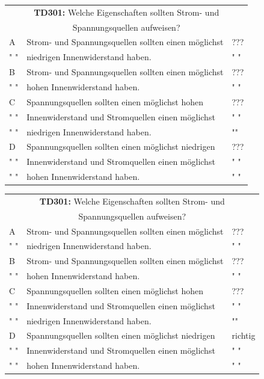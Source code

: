 \begin{frame}
	\begin{small}	
	\begin{tabular}{|l|l|l|}
	\hline
		\multicolumn{3}{|c|}{\textbf{TD301:} Welche Eigenschaften sollten Strom- und}\\
		\multicolumn{3}{|c|}{Spannungsquellen aufweisen?}\\
		\hline
		A &  Strom- und Spannungsquellen sollten einen möglichst  & ??? \\
		" " & niedrigen Innenwiderstand haben. & " "\\ \hline
		B &  Strom- und Spannungsquellen sollten einen möglichst  & ??? \\
		" " & hohen Innenwiderstand haben. & " "\\ \hline
		C & Spannungsquellen sollten einen möglichst hohen & ??? \\
		" " & Innenwiderstand und Stromquellen einen möglichst  & " " \\ 
		" " & niedrigen Innenwiderstand haben.  & "" \\ \hline
		D & Spannungsquellen sollten einen möglichst niedrigen & ??? \\
		" " & Innenwiderstand und Stromquellen einen möglichst & " " \\ 
		" " & hohen Innenwiderstand haben.  & " " \\ \hline 		
	\end{tabular}
	\end{small}
\end{frame}
\begin{frame}
	\begin{small}	
	\begin{tabular}{|l|l|l|}
	\hline
		\multicolumn{3}{|c|}{\textbf{TD301:} Welche Eigenschaften sollten Strom- und}\\
		\multicolumn{3}{|c|}{Spannungsquellen aufweisen?}\\
		\hline
		A &  Strom- und Spannungsquellen sollten einen möglichst  & ??? \\
		" " & niedrigen Innenwiderstand haben. & " "\\ \hline
		B &  Strom- und Spannungsquellen sollten einen möglichst  & ??? \\
		" " & hohen Innenwiderstand haben. & " "\\ \hline
		C & Spannungsquellen sollten einen möglichst hohen & ??? \\
		" " & Innenwiderstand und Stromquellen einen möglichst  & " " \\ 
		" " & niedrigen Innenwiderstand haben.  & "" \\ \hline
		D & Spannungsquellen sollten einen möglichst niedrigen & richtig \\
		" " & Innenwiderstand und Stromquellen einen möglichst & " " \\ 
		" " & hohen Innenwiderstand haben.  & " " \\ \hline 		
	\end{tabular}
	\end{small}
\end{frame}

